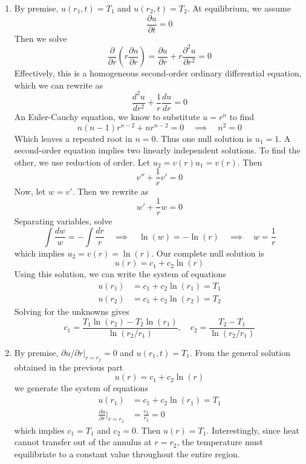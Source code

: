 \documentclass[a4paper]{article}
\begin{document}
\begin{enumerate}[label=(\alph*)]
	\item By premise, \( u \!\left( r_{1},t \right) = T_{1} \) and \( u \!\left( r_{2},t \right) = T_{2} \). At equilibrium, we assume
	\[
		\frac{\partial u}{\partial t} = 0 
	\]
	Then we solve
	\[
		\frac{\partial }{\partial r}\!\left( r \frac{\partial u}{\partial r} \right) = \frac{\partial u}{\partial r} + r \frac{\partial^2 u}{\partial r^2} = 0
	\]
	Effectively, this is a homogeneous second-order ordinary differential equation, which we can rewrite as 
	\[
		\frac{d^2 u}{d r^2} + \frac{1}{r}\frac{d u}{d r} = 0 
	\]
	An Euler-Cauchy equation, we know to substitute \( u = r^{n} \) to find
	\[
		n \!\left( n - 1 \right) r^{n-2} + n r^{n-2} = 0 \quad \implies \quad n^{2} = 0
	\]
	Which leaves a repeated root in \( n = 0 \). Thus one null solution is \( u_{1} = 1 \). A second-order equation implies two linearly independent solutions. To find the other, we use reduction of order. Let \( u_{2} = v \!\left( r \right) u_{1} = v \!\left( r \right) \). Then 
	\[
		v'' + \frac{1}{r}v' = 0 
	\]
	Now, let \( w = v' \). Then we rewrite as 
	\[
		w' + \frac{1}{r}w = 0 
	\]
	Separating variables, solve
	\[
		\int \frac{dw}{w} = -\int \frac{dr}{r} \quad \implies \quad \ln\!\left(w\right) = -\ln\!\left(r\right) \quad \implies \quad w = \frac{1}{r}
	\]
	which implies \( u_{2} = v \!\left( r \right) = \ln\!\left(r\right) \). Our complete null solution is
	\[
		u \!\left( r \right) = c_{1} + c_{2}\ln\!\left(r\right)  
	\]
	Using this solution, we can write the system of equations
	\begin{align*}
		u \!\left( r_{1} \right) & = c_{1} + c_{2}\ln\!\left(r_{1}\right) = T_{1} \\
		u \!\left( r_{2} \right) & = c_{1} + c_{2}\ln\!\left(r_{2}\right) = T_{2}
	\end{align*}
	Solving for the unknowns gives
	\[
		c_{1} = \frac{T_{1}\ln\!\left(r_{2}\right) - T_{2}\ln\!\left(r_{1}\right)}{\ln\!\left(r_{2}/r_{1}\right)}, \quad c_{2} = \frac{T_{2} - T_{1}}{\ln\!\left(r_{2}/r_{1}\right) }
	\]
	\item By premise, \( \partial u / \partial r |_{r=r_{2}} = 0 \) and \( u \!\left( r_{1},t \right) = T_{1} \). From the general solution obtained in the previous part 
	\[
		u \!\left( r \right) = c_{1} + c_{2}\ln\!\left(r\right)  
	\]
	we generate the system of equations
	\begin{align*}
		u \!\left( r_{1} \right) & = c_{1} + c_{2}\ln\!\left(r_{1}\right) = T_{1} \\
		\frac{\partial u}{\partial r}\Big|_{r=r_{2}} & = \frac{c_{2}}{r_{2}} = 0 
	\end{align*}
	which implies \( c_{1} = T_{1} \) and \( c_{2} = 0 \). Then \( u \!\left( r \right) = T_{1} \). Interestingly, since heat cannot transfer out of the annulus at \( r = r_{2} \), the temperature must equilibriate to a constant value throughout the entire region.
\end{enumerate}
\end{document}
